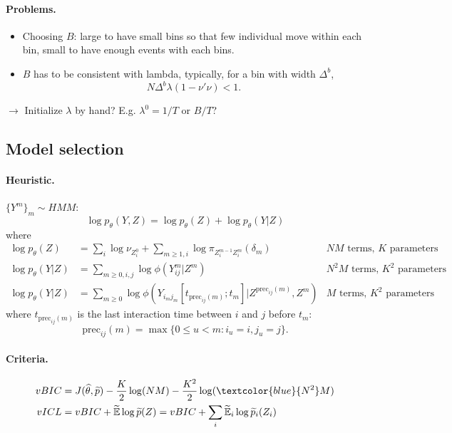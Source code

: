 \documentclass[a4paper, 12pt]{article}
\newcommand{\Esp}{\mathbb{E}}
\newcommand{\Espt}{\widetilde{\Esp}}
\newcommand{\pt}{\widetilde{p}}
\newcommand{\ra}{$\rightarrow$\xspace}
\begin{document}
\paragraph{Problems.}
\begin{itemize}
 \item Choosing $B$: large to have small bins so that few individual move within each bin, small to have enough events with each bins.
 \item $B$ has to be consistent with lambda, typically, for a bin with width $\Delta^b$,
 $$
 N \Delta^b \lambda (1-\nu'\nu) < 1.
 $$
\end{itemize}
\ra Initialize $\lambda$ by hand? E.g. $\lambda^0 = 1/T$ or $B/T$?

\subsection{Model selection}

\paragraph{Heuristic.} $\{Y^m\}_m \sim HMM$:
$$
\log p_\theta(Y, Z) = \log p_\theta(Z) + \log p_\theta(Y | Z)
$$
where
\begin{align*}
  \log p_\theta(Z)
  & = \sum_i \log \nu_{Z_i^0} + \sum_{m \geq 1, i} \log \pi_{Z_i^{m-1}Z_i^m}(\delta_m) 
  & \text{$NM$ terms, $K$ parameters} \\
  \log p_\theta(Y | Z)
  & = \sum_{m \geq 0, i, j} \log \phi(Y_{ij}^m | Z^m)
  & \text{$N^2M$ terms, $K^2$ parameters} \\
  \log p_\theta(Y | Z)
  & = \sum_{m \geq 0} \log \phi(Y_{i_m j_m}[t_{\text{prec}_{ij}(m)}; t_m] | Z^{\text{prec}_{ij}(m)}, Z^m)
  & \text{$M$ terms, $K^2$ parameters}
\end{align*}
where $t_{\text{prec}_{ij}(m)}$ is the last interaction time between $i$ and $j$ before $t_m$:
$$
\text{prec}_{ij}(m)= \max\{0 \leq u < m: i_u = i, j_u = j\}.
$$

\paragraph{Criteria.} 
\begin{align*}
 vBIC & = {J(\widehat{\theta}, \pt) - \frac{K}2 \log(NM) - \frac{K^2}2 \log(\textcolor{blue}{N^2}M)} \\
 vICL & = vBIC + \Espt\log \pt(Z) = vBIC + \sum_i \Espt_i\log \pt_i(Z_i) 
\end{align*}


\nocite{MaM16}




\end{document}
